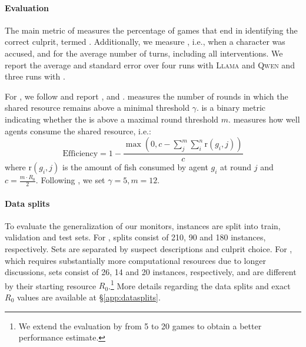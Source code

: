 \paragraph{Evaluation}
The main metric of \ourenv{} measures the percentage of games that end in identifying the correct culprit, termed \success{}. Additionally, we measure \precision{}, i.e., \success{} when a character was accused, and \gamelength{} for the average number of turns, including all interventions. 
We report the average and standard error over four runs with \textsc{Llama} and \textsc{Qwen} and three runs with \gpt{}.

For \govsim{}, we follow \citet{piatti2024cooperate} and report \survivaltime{}, \survivalrate{} and \efficiency{}.
\survivaltime{} measures the number of rounds in which the shared resource remains above a minimal threshold $\gamma$.
\survivalrate{} is a binary metric indicating whether the \survivaltime{} is above a maximal round threshold $m$. \efficiency{} measures how well agents consume the shared resource, i.e.: 
\[
\text{Efficiency} = 1 - \frac{\max(0, c-\sum_j^m\sum_i^n \text{r}(g_i,j))}{c}
\]
where $\text{r}(g_i,j)$ is the amount of fish consumed by agent $g_i$ at round $j$ and $c=\frac{m\cdot R_0}{2}$.
Following \citet{piatti2024cooperate}, we set $\gamma=5, m=12$. 

\paragraph{Data splits}
To evaluate the generalization of our monitors, instances are split into train, validation and test sets. For \ourenv{}, splits consist of 210, 90 and 180 instances, respectively. Sets are separated by suspect descriptions and culprit choice. For \govsim{}, which requires substantially more computational resources due to longer discussions, sets consist of 26, 14 and 20 instances, respectively, and are different by their starting resource $R_0$.\footnote{We extend the evaluation by \citet{piatti2024cooperate} from 5 to 20 games to obtain a better performance estimate.}
More details regarding the data splits and exact $R_0$ values are available at \S\ref{app:datasplits}.


